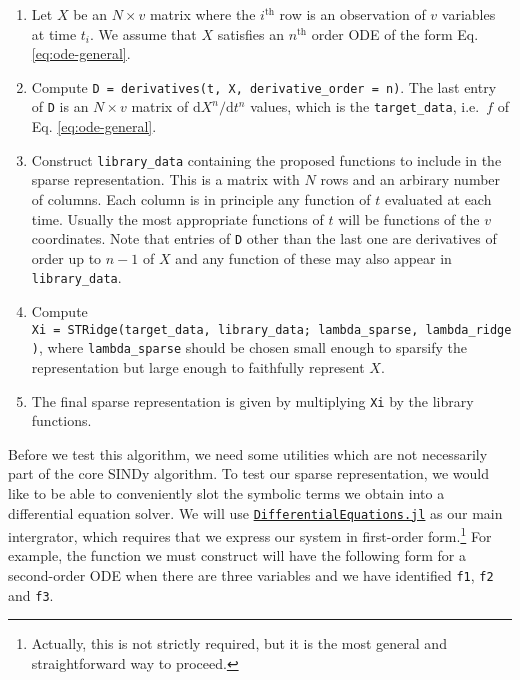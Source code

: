 \documentclass[
]{article}
\providecommand{\tightlist}{%
  \setlength{\itemsep}{0pt}\setlength{\parskip}{0pt}}\usepackage{longtable,booktabs,array}
\begin{document}
\begin{tcolorbox}[enhanced jigsaw, colback=white, bottomtitle=1mm, coltitle=black, arc=.35mm, toprule=.15mm, opacitybacktitle=0.6, leftrule=.75mm, titlerule=0mm, breakable, colbacktitle=quarto-callout-note-color!10!white, rightrule=.15mm, colframe=quarto-callout-note-color-frame, bottomrule=.15mm, toptitle=1mm, title={SINDy {[}standard{]}}, left=2mm, opacityback=0]

\begin{enumerate}
\def\labelenumi{\arabic{enumi}.}
\tightlist
\item
  Let \(X\) be an \(N \times v\) matrix where the \(i^\text{th}\) row is
  an observation of \(v\) variables at time \(t_i\). We assume that
  \(X\) satisfies an \(n^\text{th}\) order ODE of the form Eq.
  \eqref{eq:ode-general}.
\item
  Compute \texttt{D\ =\ derivatives(t,\ X,\ derivative\_order\ =\ n)}.
  The last entry of \texttt{D} is an \(N \times v\) matrix of
  \(\text{d}X^n/\text{d}t^n\) values, which is the
  \texttt{target\_data}, i.e.~\(f\) of Eq. \eqref{eq:ode-general}.
\item
  Construct \texttt{library\_data} containing the proposed functions to
  include in the sparse representation. This is a matrix with \(N\) rows
  and an arbirary number of columns. Each column is in principle any
  function of \(t\) evaluated at each time. Usually the most appropriate
  functions of \(t\) will be functions of the \(v\) coordinates. Note
  that entries of \texttt{D} other than the last one are derivatives of
  order up to \(n - 1\) of \(X\) and any function of these may also
  appear in \texttt{library\_data}.
\item
  Compute
  \texttt{Xi\ =\ STRidge(target\_data,\ library\_data;\ lambda\_sparse,\ lambda\_ridge)},
  where \texttt{lambda\_sparse} should be chosen small enough to
  sparsify the representation but large enough to faithfully represent
  \(X\).
\item
  The final sparse representation is given by multiplying \texttt{Xi} by
  the library functions.
\end{enumerate}

\end{tcolorbox}

Before we test this algorithm, we need some utilities which are not
necessarily part of the core SINDy algorithm. To test our sparse
representation, we would like to be able to conveniently slot the
symbolic terms we obtain into a differential equation solver. We will
use
\href{https://docs.sciml.ai/DiffEqDocs/latest/}{\texttt{DifferentialEquations.jl}}
as our main intergrator, which requires that we express our system in
first-order
form.\footnote{Actually, this is not strictly required, but it is the most general and straightforward way to proceed.}
For example, the function we must construct will have the following form
for a second-order ODE when there are three variables and we have
identified \texttt{f1}, \texttt{f2} and \texttt{f3}.
\end{document}

